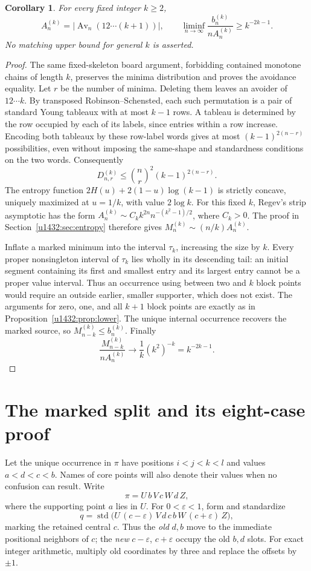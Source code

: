 \documentclass[11pt]{article}
\newtheorem{corollary}[theorem]{Corollary}
\theoremstyle{remark}\newtheorem{remark}[theorem]{Remark}
\newcommand{\Av}{\operatorname{Av}}
\newcommand{\std}{\operatorname{std}}
\begin{document}
\begin{corollary}\label{u1432:cor:general}
For every fixed integer $k\ge2$,
\[
 A_n^{(k)}=|\Av_n(12\cdots(k+1))|,\qquad
 \liminf_{n\to\infty}\frac{b_n^{(k)}}{nA_n^{(k)}}
 \ge k^{-2k-1}.
\]
No matching upper bound for general $k$ is asserted.
\end{corollary}
\begin{proof}
The same fixed-skeleton board argument, forbidding contained monotone
chains of length $k$, preserves the minima distribution and proves the
avoidance equality. Let $r$ be the number of minima. Deleting them leaves
an avoider of $12\cdots k$. By transposed Robinson--Schensted, each such
permutation is a pair of standard Young tableaux with at most $k-1$ rows.
A tableau is determined by the row occupied by each of its labels, since
entries within a row increase. Encoding both tableaux by these row-label
words gives at most $(k-1)^{2(n-r)}$ possibilities, even without imposing
the same-shape and standardness conditions on the two words. Consequently
\[
 D_{n,r}^{(k)}\le \binom{n}{r}^{\!2}(k-1)^{2(n-r)}.
\]
The entropy function $2H(u)+2(1-u)\log(k-1)$ is strictly concave,
uniquely maximized at $u=1/k$, with value $2\log k$.
For this fixed $k$, Regev's strip asymptotic has the form
$A_n^{(k)}\sim C_k k^{2n}n^{-(k^2-1)/2}$, where $C_k>0$.
The proof in Section~\ref{u1432:sec:entropy} therefore gives
$M_n^{(k)}\sim(n/k)A_n^{(k)}$.

Inflate a marked minimum into the interval $\tau_k$, increasing the size
by $k$. Every proper nonsingleton interval of $\tau_k$ lies wholly in
its descending tail: an initial segment containing its first and smallest
entry and its largest entry cannot be a proper value interval. Thus an
occurrence using between two and $k$ block points would require an outside
earlier, smaller supporter, which does not exist. The arguments for zero,
one, and all $k+1$ block points are exactly as in
Proposition~\ref{u1432:prop:lower}. The unique internal occurrence recovers
the marked source, so $M_{n-k}^{(k)}\le b_n^{(k)}$. Finally
\[
 \frac{M_{n-k}^{(k)}}{nA_n^{(k)}}\longrightarrow
 \frac1k(k^2)^{-k}=k^{-2k-1}.
\]
\end{proof}

\section{The marked split and its eight-case proof}\label{u1432:sec:split}
Let the unique occurrence in $\pi$ have positions $i<j<k<l$ and values
$a<d<c<b$. Names of core points will also denote their values when no
confusion can result. Write
\[
 \pi=U\,b\,V\,c\,W\,d\,Z,
\]
where the supporting point $a$ lies in $U$. For $0<\varepsilon<1$,
form and standardize
\begin{equation}\label{u1432:eq:split}
 q=\std\bigl(U\,(c-\varepsilon)\,V\,d\,c\,b\,W\,
                      (c+\varepsilon)\,Z\bigr),
\end{equation}
marking the retained central $c$. Thus the \emph{old} $d,b$ move to the
immediate positional neighbors of $c$; the \emph{new} $c-\varepsilon$,
$c+\varepsilon$ occupy the old $b,d$ slots. For exact integer arithmetic,
multiply old coordinates by three and replace the offsets by $\pm1$.
\end{document}

